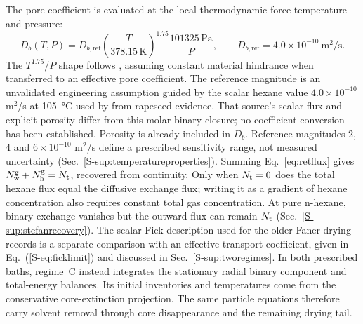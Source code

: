 The pore coefficient is evaluated at the local thermodynamic-force
temperature and pressure:
\begin{equation}
D_b(T,P)=D_{b,\mathrm{ref}}
 \left(\frac{T}{378.15\,\mathrm K}\right)^{1.75}
 \frac{101325\,\mathrm{Pa}}{P},
\qquad D_{b,\mathrm{ref}}=4.0\times10^{-10}\ \mathrm{m^2/s}.
\label{eq:porediffusivitytemperature}
\end{equation}
The $T^{1.75}/P$ shape follows \citet{fuller1966new}, assuming constant
material hindrance when transferred to an effective pore coefficient.
The reference magnitude is an unvalidated engineering assumption guided by
the scalar hexane value $4.0\times10^{-10}$ m$^2$/s at \SI{105}{\celsius}
used by \citet{cardarelli2002modeling} from rapeseed evidence. That source's
scalar flux and explicit porosity differ from this molar binary closure;
no coefficient conversion has been established. Porosity is already
included in $D_b$. Reference magnitudes $2$, $4$ and
$6\times10^{-10}$ m$^2$/s define a prescribed sensitivity range,
not measured uncertainty (Sec.~\ref*{S-sup:temperatureproperties}).
Summing Eq.~\eqref{eq:retflux} gives
$N_{\mathrm w}^{\mathrm g}+N_{\mathrm h}^{\mathrm g}=N_{\mathrm{t}}$, recovered from
continuity. Only when $N_{\mathrm{t}}=0$ does the total hexane flux equal the
diffusive exchange flux; writing it as a gradient of hexane concentration
also requires constant total gas concentration. At pure n-hexane,
binary exchange vanishes but the outward flux can remain $N_{\mathrm{t}}$
(Sec.~\ref*{S-sup:stefanrecovery}).
The scalar Fick description used for the older Faner drying records is a
separate comparison with an effective transport coefficient, given in
Eq.~(\ref*{S-eq:ficklimit}) and discussed in Sec.~\ref*{S-sup:tworegimes}. In both prescribed baths, regime~C instead
integrates the stationary radial binary component and total-energy balances.
Its initial inventories and temperatures come from the conservative
core-extinction projection. The same particle equations therefore carry
solvent removal through core disappearance and the remaining drying tail.

